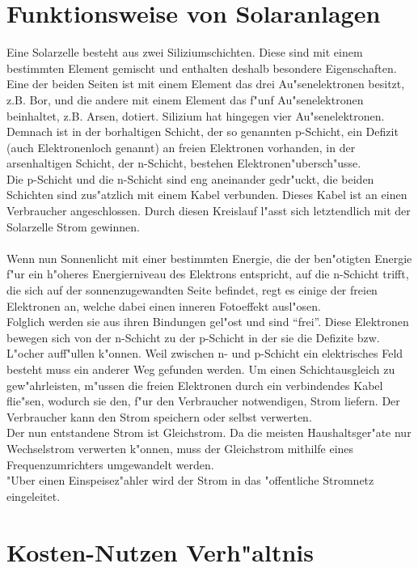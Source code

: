 \documentclass[12pt,titlepage]{article}
\begin{document}
\section{Funktionsweise von Solaranlagen}
Eine Solarzelle besteht aus zwei Siliziumschichten. Diese sind mit einem bestimmten Element gemischt und enthalten deshalb besondere Eigenschaften.\\ Eine der beiden Seiten ist mit einem Element das drei Au"senelektronen besitzt, z.B. Bor, und die andere mit einem Element das f"unf Au"senelektronen beinhaltet, z.B. Arsen, dotiert. Silizium hat hingegen vier Au"senelektronen. Demnach ist in der borhaltigen Schicht, der so genannten p-Schicht, ein Defizit (auch Elektronenloch genannt) an freien Elektronen vorhanden, in der arsenhaltigen Schicht, der n-Schicht, bestehen Elektronen"ubersch"usse.\\ Die p-Schicht und die n-Schicht sind eng aneinander gedr"uckt, die beiden Schichten sind zus"atzlich mit einem Kabel verbunden. Dieses Kabel ist an einen  Verbraucher angeschlossen. Durch diesen Kreislauf l"asst sich letztendlich mit der Solarzelle Strom gewinnen.\\\\
Wenn nun Sonnenlicht mit einer bestimmten Energie, die der ben"otigten Energie f"ur ein h"oheres  Energierniveau des Elektrons entspricht, auf die n-Schicht trifft, die sich auf der sonnenzugewandten Seite befindet, regt es einige der freien Elektronen an, welche dabei einen inneren Fotoeffekt ausl"osen.\\ Folglich werden sie aus ihren Bindungen gel"ost und sind "`frei"'. Diese Elektronen bewegen sich von der n-Schicht zu der p-Schicht in der sie die Defizite bzw. L"ocher auff"ullen k"onnen. Weil zwischen n- und p-Schicht ein elektrisches Feld besteht muss ein anderer Weg gefunden werden. Um einen Schichtausgleich zu gew"ahrleisten, m"ussen die freien Elektronen durch ein verbindendes Kabel flie"sen, wodurch sie den, f"ur den Verbraucher notwendigen, Strom liefern. Der Verbraucher kann den Strom speichern oder selbst verwerten.\\ Der nun entstandene Strom ist Gleichstrom. Da die meisten Haushaltsger"ate nur Wechselstrom verwerten k"onnen, muss der Gleichstrom mithilfe eines Frequenzumrichters umgewandelt werden.\\
"Uber einen Einspeisez"ahler wird der Strom in das "offentliche Stromnetz eingeleitet. 
 

\section{Kosten-Nutzen Verh"altnis}
\end{document}
